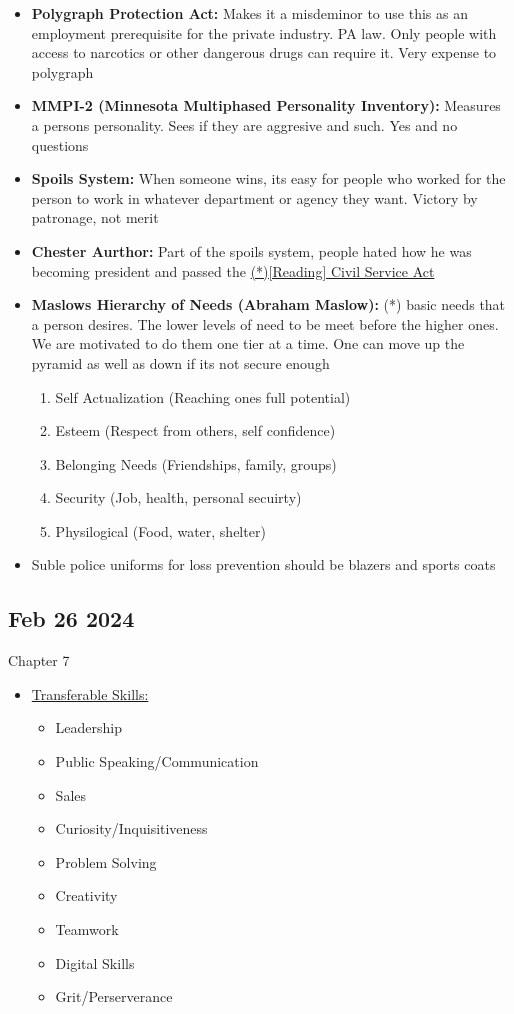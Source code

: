\documentclass[12pt]{article}
\begin{document}
\begin{itemize}
		  \item \textbf{Polygraph Protection Act:} Makes it a misdeminor to use this as an employment
		 		prerequisite for the private industry. PA law. Only people with access to narcotics
			   or other dangerous drugs can require it. Very expense to polygraph	
		  \item \textbf{MMPI-2 (Minnesota Multiphased Personality Inventory):} Measures a persons personality.
		 		Sees if they are aggresive and such. Yes and no questions
		  \item \textbf{Spoils System:} When someone wins, its easy for people who worked for the person
		 		to work in whatever department or agency they want. Victory by patronage, not merit 
		  \item \textbf{Chester Aurthor:} Part of the spoils system, people hated how he was becoming president
		 		and passed the \underline{(*)[Reading] Civil Service Act} 
		  \item \textbf{Maslows Hierarchy of Needs (Abraham Maslow):} (*) basic needs that a person desires. 
		  		The lower levels
		  		of need to be meet before the higher ones. We are motivated to do them one tier at a time. 
				One can move up the pyramid as well as down if its not secure enough
		 		\begin{enumerate}
					\item Self Actualization (Reaching ones full potential)
					\item Esteem (Respect from others, self confidence)
					\item Belonging Needs (Friendships, family, groups)
					\item Security (Job, health, personal secuirty)
					\item Physilogical (Food, water, shelter)
			  	\end{enumerate}	
			\item Suble police uniforms for loss prevention should be blazers and sports coats
\end{itemize}

\subsection*{Feb 26 2024}

Chapter 7

\begin{itemize}
		  \item \underline{Transferable Skills:}
		  		\begin{itemize}
					\item Leadership 
					\item Public Speaking/Communication
					\item Sales
					\item Curiosity/Inquisitiveness
					\item Problem Solving
					\item Creativity
					\item Teamwork
					\item Digital Skills
					\item Grit/Perserverance
				\end{itemize}
\end{itemize}
\end{document}

